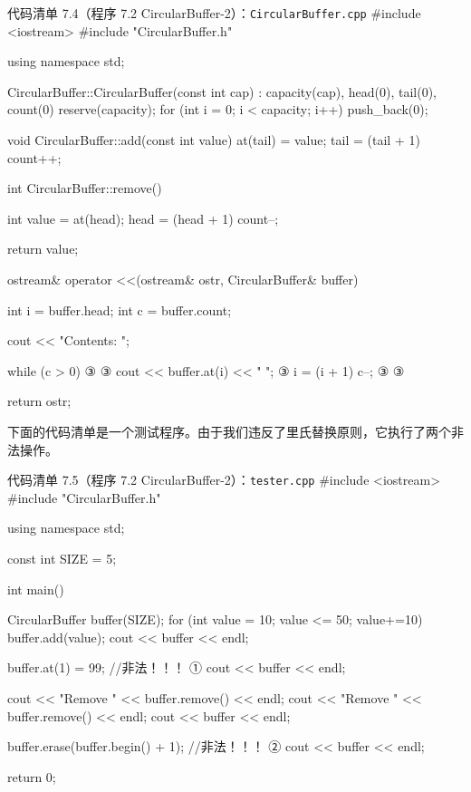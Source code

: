 \begin{codeboxt}{代码清单 7.4（程序 7.2 CircularBuffer-2）：\texttt{Circular\allowbreak{}Buffer.\allowbreak{}cpp}}
#include <iostream>
#include "CircularBuffer.h"

using namespace std;

CircularBuffer::CircularBuffer(const int cap)
    : capacity(cap), head(0), tail(0), count(0)
{
    reserve(capacity);
    for (int i = 0; i < capacity; i++) push_back(0);
}

void CircularBuffer::add(const int value)
{
    at(tail) = value;
    tail = (tail + 1)%
    count++;
}

int CircularBuffer::remove()
{
    int value = at(head);
    head = (head + 1)%
    count--;

    return value;
}

ostream& operator <<(ostream& ostr, CircularBuffer& buffer)
{
    int i = buffer.head;
    int c = buffer.count;

    cout << "Contents: ";

    while (c > 0)                            ③
    {                                        ③
        cout << buffer.at(i) << " ";         ③
        i = (i + 1)%
        c--;                                 ③
    }                                        ③

    return ostr;
}
\end{codeboxt}
\par
{}\par
{}\par

下面的代码清单是一个测试程序。由于我们违反了里氏替换原则，它执行了两个非法操作。

\begin{codeboxt}{代码清单 7.5（程序 7.2 CircularBuffer-2）：\texttt{tester.\allowbreak{}cpp}}
#include <iostream>
#include "CircularBuffer.h"

using namespace std;

const int SIZE = 5;

int main()
{
    CircularBuffer buffer(SIZE);
    for (int value = 10; value <= 50; value+=10)
    {
        buffer.add(value);
    }
    cout << buffer << endl;

    buffer.at(1) = 99;  //非法！！！                ①
    cout << buffer << endl;

    cout << "Remove " << buffer.remove() << endl;
    cout << "Remove " << buffer.remove() << endl;
    cout << buffer << endl;

    buffer.erase(buffer.begin() + 1);  //非法！！！ ②
    cout << buffer << endl;

    return 0;
}
\end{codeboxt}
\par
{}\par

